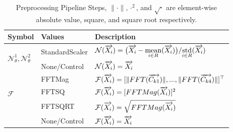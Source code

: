 \begin{table}[h]
\centering
\label{tab:preproc}
\caption{Preprocessing Pipeline Steps, $\|\cdot\|, \cdot^2$, and $\sqrt{\cdot}$ are element-wise
 absolute value, square, and square root respectively.}
{\renewcommand{\arraystretch}{1.5}%
\begin{tabular}{l|l|l}
Symbol                  & Values         & Description    \\ \hline 
\multirow{2}{*}{$\mathcal{N}_\theta^1, \mathcal{N}_\theta^2$} & StandardScaler 
   & $\mathcal{N}(\overrightarrow{X_i}) = \big(\overrightarrow{X_i} - \underset{i \in R}{\mathrm{mean}} (\overrightarrow{X_{i}}) \big)/ 
                                  \underset{i \in R}{\mathrm{std}}(\overrightarrow{X_{i}})$ \\
   & None/Control   & $\mathcal{N}(\overrightarrow{X_i}) = \overrightarrow{X_i}$   \\ \hline
\multirow{3}{*}{$\mathcal{F}$}      & FFTMag        
              & $\mathcal{F}(\overrightarrow{X_i}) = [\|FFT(\overrightarrow{C_{k1}})\|,  ..., \|FFT(\overrightarrow{C_{k4}})\|]^\top$     \\
              & FFTSQ        & $\mathcal{F}(\overrightarrow{X_i}) = [FFTMag(\overrightarrow{X_i})]^2 $         \\
              & FFTSQRT       & $\mathcal{F}(\overrightarrow{X_i}) = \sqrt{FFTMag(\overrightarrow{X_i})}$      \\
              & None/Control  & $\mathcal{F}(\overrightarrow{X_i}) = \overrightarrow{X_i}$           
\end{tabular}}
\end{table}

